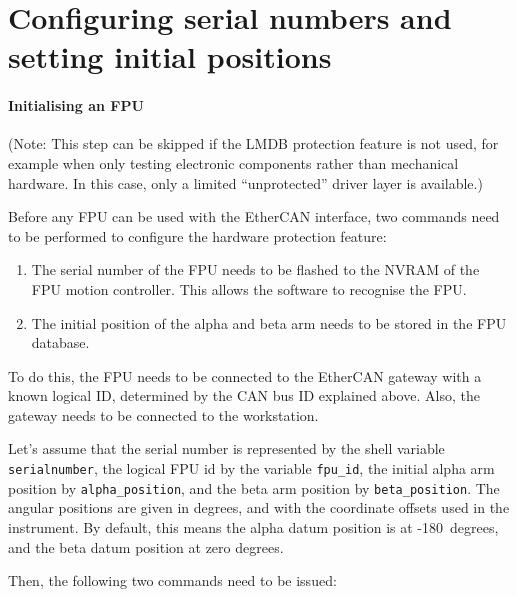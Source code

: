 \documentclass[fontsize=12,a4paper]{scrreprt}
\begin{document}
\section{Configuring serial numbers and setting initial positions}
\label{sec:setinitialposition}

\paragraph{Initialising an FPU}

(Note: This step can be skipped if the LMDB protection feature is not
used, for example when only testing electronic components rather than
mechanical hardware. In this case, only a limited ``unprotected''
driver layer is available.)

Before any FPU can be used with the EtherCAN interface, two commands
need to be performed to configure the hardware protection feature:

\begin{enumerate}
\item The serial number of the FPU needs to be flashed to the
  NVRAM of the FPU motion controller. This allows the software
  to recognise the FPU.
\item The initial position of the alpha and beta arm needs to
  be stored in the FPU database.
\end{enumerate}

To do this, the FPU needs to be connected to the EtherCAN gateway with
a known logical ID, determined by the CAN bus ID explained
above. Also, the gateway needs to be connected to the workstation.

Let's assume that the serial number is represented by the shell
variable \texttt{serialnumber}, the logical FPU id by the variable
\texttt{fpu\_id}, the initial alpha arm position by
\texttt{alpha\_position}, and the beta arm position by
\texttt{beta\_position}. The angular positions are given in degrees,
and with the coordinate offsets used in the instrument. By default,
this means the alpha datum position is at -180\degree\ degrees, and the beta
datum position at zero degrees.

Then, the following two commands need to be issued:
%
%
%
%
%
%
\end{document}
